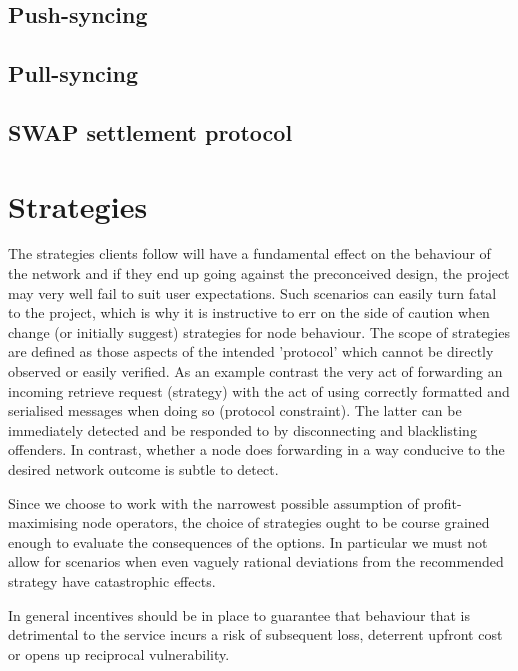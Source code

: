 \section{Push-syncing  \statusorange}\label{spec:protocol:push-sync}


\section{Pull-syncing \statusorange}\label{spec:protocol:pull-sync}


\section{SWAP settlement protocol \statusorange}\label{spec:protocol:swap}


\chapter{Strategies \statusorange}\label{spec:strategy}


The strategies clients follow will have a fundamental effect on the behaviour of the network and if they end up going against the preconceived design, the project may very well fail to suit user expectations. Such scenarios can easily turn fatal to the project, which is why it is instructive to err on the side of caution when change (or initially suggest) strategies for node behaviour.
The scope of strategies are defined as those aspects of the intended 'protocol' which cannot be directly observed or easily verified. As an example contrast the very act of forwarding an incoming retrieve request (strategy) with the act of using correctly formatted and serialised messages when doing so (protocol constraint). The latter can be immediately detected and be responded to by disconnecting and blacklisting offenders. In contrast, whether a node does forwarding in a way conducive to the desired network outcome is subtle to detect. 

Since we choose to work with the narrowest possible assumption of profit-maximising node operators, the choice of strategies ought to be course grained enough to evaluate the consequences of the options. In particular we must not allow for scenarios when even vaguely rational deviations from the recommended strategy have catastrophic effects.

In general incentives should be in place to guarantee that behaviour that is detrimental to the service incurs a risk of subsequent loss, deterrent upfront cost or opens up reciprocal  vulnerability. 

